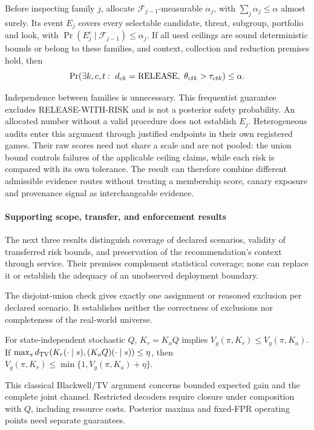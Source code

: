 \begin{theorem}
\label{thm:statistics}
Before inspecting family $j$, allocate $\mathcal F_{j-1}$-measurable
$\alpha_j$, with $\sum_j\alpha_j\le\alpha$ almost surely. Its event $E_j$
covers every selectable candidate, threat, subgroup, portfolio and look,
with $\Pr(E_j^c\mid\mathcal F_{j-1})\le\alpha_j$. If all used ceilings are
sound deterministic bounds or belong to these families, and context,
collection and reduction premises hold, then
\[
 \Pr(\exists k,c,t:\ d_{ck}=\mathrm{RELEASE},\
                    \theta_{ctk}>\tau_{ctk})\le\alpha .
\]
\end{theorem}
Independence between families is unnecessary. This frequentist guarantee
excludes RELEASE-WITH-RISK and is not a posterior safety probability.
An allocated number without a valid procedure does not establish $E_j$.
Heterogeneous audits enter this argument through justified endpoints in their
own registered games. Their raw scores need not share a scale and are not
pooled: the union bound controls failures of the applicable ceiling claims,
while each risk is compared with its own tolerance. The result can therefore
combine different admissible evidence routes without treating a membership
score, canary exposure and provenance signal as interchangeable evidence.

\paragraph{Supporting scope, transfer, and enforcement results}
The next three results distinguish coverage of declared scenarios, validity
of transferred risk bounds, and preservation of the recommendation's context
through service. Their premises complement statistical coverage; none can
replace it or establish the adequacy of an unobserved deployment boundary.

\begin{proposition}
\label{prop:scope}
The disjoint-union check gives exactly one assignment or reasoned exclusion
per declared scenario. It establishes neither the correctness of exclusions
nor completeness of the real-world universe.
\end{proposition}

\begin{theorem}
\label{thm:transfer}
For state-independent stochastic $Q$, $K_r=K_aQ$ implies
$V_g(\pi,K_r)\le V_g(\pi,K_a)$. If
$\max_s d_{\rm TV}(K_r(\cdot\mid s),(K_aQ)(\cdot\mid s))\le\eta$, then
$V_g(\pi,K_r)\le\min\{1,V_g(\pi,K_a)+\eta\}$.
\end{theorem}
This classical Blackwell/TV argument concerns bounded expected gain and the
complete joint channel. Restricted decoders require closure under composition
with $Q$, including resource costs. Posterior maxima and fixed-FPR operating
points need separate guarantees.

